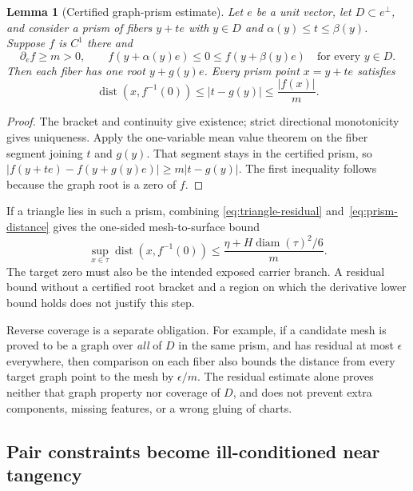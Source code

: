 \documentclass[11pt]{article}
\newtheorem{lemma}[theorem]{Lemma}
\theoremstyle{definition}
\theoremstyle{remark}
\newcommand{\dist}{\operatorname{dist}}
\newcommand{\diam}{\operatorname{diam}}
\begin{document}
\begin{lemma}[Certified graph-prism estimate]
\label{lem:graph-prism}
Let $e$ be a unit vector, let $D\subset e^\perp$, and consider a
prism of fibers $y+te$ with $y\in D$ and
$\alpha(y)\le t\le\beta(y)$. Suppose $f$ is $C^1$ there and
\[
  \partial_e f\ge m>0,\qquad
  f(y+\alpha(y)e)\le0\le f(y+\beta(y)e)
  \quad\text{for every }y\in D.
\]
Then each fiber has one root $y+g(y)e$. Every prism point $x=y+te$
satisfies
\[
  \dist(x,f^{-1}(0))\le |t-g(y)|\le\frac{|f(x)|}{m}.
  \tag{12}\label{eq:prism-distance}
\]
\end{lemma}

\begin{proof}
The bracket and continuity give existence; strict directional
monotonicity gives uniqueness. Apply the one-variable mean value
theorem on the fiber segment joining $t$ and $g(y)$. That segment
stays in the certified prism, so
$|f(y+te)-f(y+g(y)e)|\ge m|t-g(y)|$.
The first inequality follows because the graph root is a zero of $f$.
\end{proof}

If a triangle lies in such a prism, combining
\eqref{eq:triangle-residual} and~\eqref{eq:prism-distance} gives the
one-sided mesh-to-surface bound
\[
  \sup_{x\in\tau}\dist(x,f^{-1}(0))
  \le \frac{\eta+H\diam(\tau)^2/6}{m}.
\]
The target zero must also be the intended exposed carrier branch.
A residual bound without a certified root bracket and a region on
which the derivative lower bound holds does not justify this step.

Reverse coverage is a separate obligation. For example, if a candidate
mesh is proved to be a graph over \emph{all} of $D$ in the same prism,
and has residual at most $\epsilon$ everywhere, then comparison on
each fiber also bounds the distance from every target graph point to
the mesh by $\epsilon/m$. The residual estimate alone proves neither
that graph property nor coverage of $D$, and does not prevent extra
components, missing features, or a wrong gluing of charts.

\subsection{Pair constraints become ill-conditioned near tangency}
\end{document}

